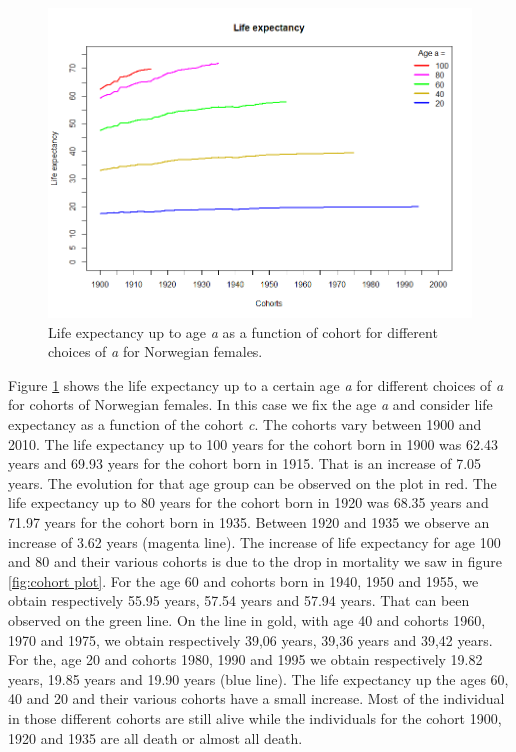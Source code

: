             \begin{figure}[tbh]
             \centering
              \includegraphics[width=0.8\linewidth]{figures/life_expectancy_cohort.png}
              \caption{Life expectancy up to age \textit{a} as a function of cohort for different choices of \textit{a} for Norwegian females.}
              \label{fig:cohort life expectancy}
            \end{figure}




Figure \ref{fig:cohort life expectancy} shows the life expectancy up to a certain age \textit{a} for different choices of \textit{a} for cohorts of Norwegian females. 
In this case we fix the age \textit{a} and consider life expectancy as a function of the cohort \textit{c}.
The cohorts vary between 1900 and 2010.
The life expectancy up to 100 years for the cohort born in 1900 was 62.43 years and 69.93 years for the cohort born in 1915.
That is an increase of 7.05 years. 
The evolution for that age group can be observed on the plot in red. 
The life expectancy up to 80 years for the cohort born in 1920 was 68.35 years and 71.97 years for the cohort born in 1935. Between 1920 and 1935 we observe an increase of 3.62 years (magenta line).
The increase of life expectancy for age 100 and 80 and their various cohorts is due to the drop in mortality we saw in figure \ref{fig:cohort plot}. 
For the age 60 and cohorts born in 1940, 1950 and 1955, we obtain respectively 55.95 years, 57.54 years and 57.94 years.
That can been observed on the green line. 
On the line in gold, with age 40 and cohorts 1960, 1970 and 1975, we obtain respectively 39,06 years, 39,36 years and 39,42 years. 
For the, age 20 and cohorts 1980, 1990 and 1995 we obtain respectively 19.82 years, 19.85 years and 19.90 years (blue line).
The life expectancy up the ages 60, 40 and 20 and their various cohorts have a small increase. Most of the individual in those different cohorts are still alive while the individuals for the cohort 1900, 1920 and 1935 are all death or almost all death.

